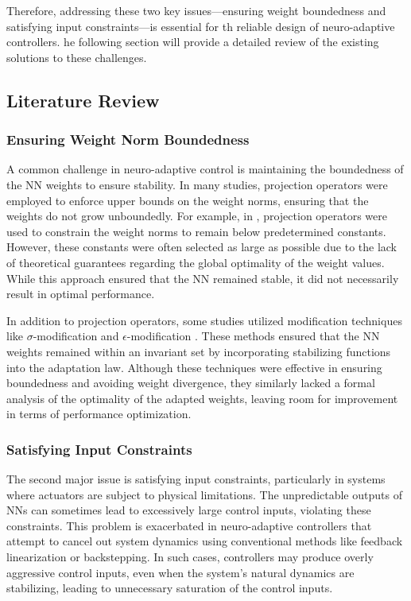 \documentclass[lettersize,journal]{IEEEtran}
\begin{document}
Therefore, addressing these two key issues—ensuring weight boundedness and satisfying input constraints—is essential for th reliable design of neuro-adaptive controllers. 
he following section will provide a detailed review of the existing solutions to these challenges.

\subsection{Literature Review}

\subsubsection{Ensuring Weight Norm Boundedness}

A common challenge in neuro-adaptive control is maintaining the boundedness of the NN weights to ensure stability. 
In many studies, projection operators were employed to enforce upper bounds on the weight norms, ensuring that the weights do not grow unboundedly. 
For example, in \cite{Zhou:2023aa,Griffis:2023aa,Patil:2022aa}, projection operators were used to constrain the weight norms to remain below predetermined constants. 
However, these constants were often selected as large as possible due to the lack of theoretical guarantees regarding the global optimality of the weight values. 
While this approach ensured that the NN remained stable, it did not necessarily result in optimal performance.

In addition to projection operators, some studies utilized modification techniques like $\sigma$-modification \cite{Ge:2002aa} and $\epsilon$-modification \cite{Esfandiari:2015aa,Gao:2006aa}. 
These methods ensured that the NN weights remained within an invariant set by incorporating stabilizing functions into the adaptation law. 
Although these techniques were effective in ensuring boundedness and avoiding weight divergence, they similarly lacked a formal analysis of the optimality of the adapted weights, leaving room for improvement in terms of performance optimization.

\subsubsection{Satisfying Input Constraints}

The second major issue is satisfying input constraints, particularly in systems where actuators are subject to physical limitations. 
The unpredictable outputs of NNs can sometimes lead to excessively large control inputs, violating these constraints. 
This problem is exacerbated in neuro-adaptive controllers that attempt to cancel out system dynamics using conventional methods like feedback linearization or backstepping. 
In such cases, controllers may produce overly aggressive control inputs, even when the system's natural dynamics are stabilizing, leading to unnecessary saturation of the control inputs.
\end{document}

